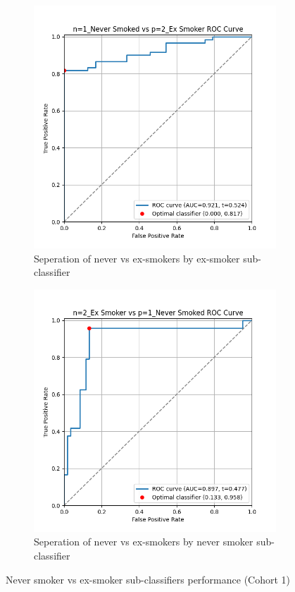 \documentclass{article}
\begin{document}
\begin{figure}
    \begin{subfigure}{0.48\textwidth}
        \centering
        \includegraphics[width=\linewidth]{cohort1_1v2_roc.png}
        \caption{Seperation of never vs ex-smokers by ex-smoker sub-classifier}
    \end{subfigure}
    \hfill
    \begin{subfigure}{0.48\textwidth}
        \centering
        \includegraphics[width=\linewidth]{cohort1_2v1_roc.png}
        \caption{Seperation of never vs ex-smokers by never smoker sub-classifier}
    \end{subfigure}
    \caption{Never smoker vs ex-smoker sub-classifiers performance (Cohort 1)}
\end{figure}
\end{document}

